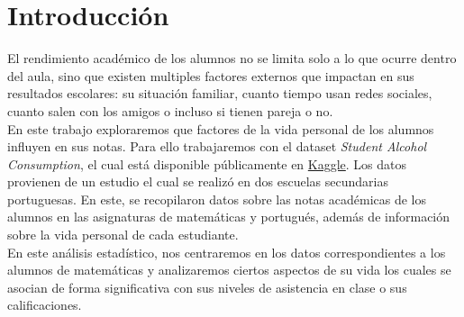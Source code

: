 \chapter{Introducción}

El rendimiento académico de los alumnos no se limita solo a lo que ocurre dentro del aula, sino que existen multiples factores externos que impactan en sus resultados escolares: su situación familiar, cuanto tiempo usan redes sociales, cuanto salen con los amigos o incluso si tienen pareja o no.\\
En este trabajo exploraremos que factores de la vida personal de los alumnos influyen en sus notas. Para ello trabajaremos con el dataset \textit{Student Alcohol Consumption}, el cual está disponible públicamente en \href{https://www.kaggle.com/datasets/uciml/student-alcohol-consumption}{Kaggle}. Los datos provienen de un estudio \cite{Cortez2008} el cual se realizó en dos escuelas secundarias portuguesas. En este, se recopilaron datos sobre las notas académicas de los alumnos en las asignaturas de matemáticas y portugués, además de información sobre la vida personal de cada estudiante. \\
En este análisis estadístico, nos centraremos en los datos correspondientes a los alumnos de matemáticas y analizaremos ciertos aspectos de su vida los cuales se asocian de forma significativa con sus niveles de asistencia en clase o sus calificaciones.
